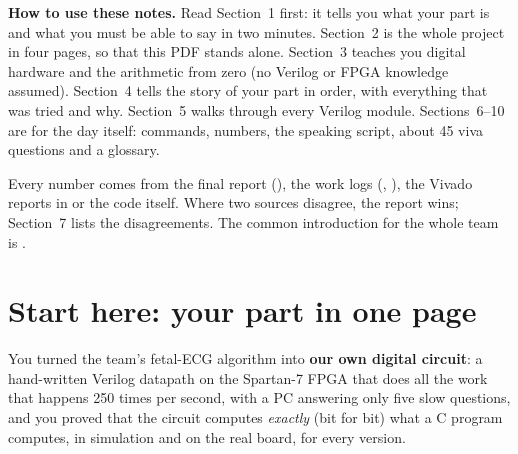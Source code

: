 \documentclass[11pt]{article}
\begin{document}

\begin{center}
\begin{minipage}{0.86\linewidth}
\small
\textbf{How to use these notes.} Read Section~1 first: it tells you what your part is and what you must be able to say in two minutes. Section~2 is the whole project in four pages, so that this PDF stands alone. Section~3 teaches you digital hardware and the arithmetic from zero (no Verilog or FPGA knowledge assumed). Section~4 tells the story of your part in order, with everything that was tried and why. Section~5 walks through every Verilog module. Sections~6--10 are for the day itself: commands, numbers, the speaking script, about 45 viva questions and a glossary.

Every number comes from the final report (), the work logs (, ), the Vivado reports in  or the code itself. Where two sources disagree, the report wins; Section~7 lists the disagreements. The common introduction for the whole team is .
\end{minipage}
\end{center}

\newpage
\tableofcontents
\newpage

\section{Start here: your part in one page}

\begin{keyfact}
You turned the team's fetal-ECG algorithm into \textbf{our own digital circuit}: a hand-written Verilog datapath on the Spartan-7 FPGA that does all the work that happens 250 times per second, with a PC answering only five slow questions, and you proved that the circuit computes \emph{exactly} (bit for bit) what a C program computes, in simulation and on the real board, for every version.
\end{keyfact}
\end{document}
